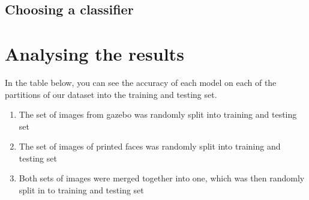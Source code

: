 \documentclass[12pt,a4paper]{article}
\begin{document}
    \subsection{Choosing a classifier}


    \section{Analysing the results}


    In the table below, you can see the accuracy of each model on each of the partitions of our dataset into the training and testing set.
    \begin{enumerate}
		\item The set of images from gazebo was randomly split into training and testing set 
		\item The set of images of printed faces was randomly split into training and testing set
		\item Both sets of images were merged together into one, which was then randomly split in to training and testing set
    \end{enumerate}
\end{document}
